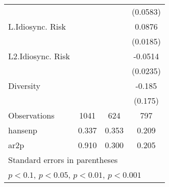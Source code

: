 {\begin{tabular}{l*{3}{c}}
                    &                     &                     &    (0.0583)         \\
L.Idiosync. Risk    &                     &                     &      0.0876\sym{***}\\
                    &                     &                     &    (0.0185)         \\
L2.Idiosync. Risk   &                     &                     &     -0.0514\sym{*}  \\
                    &                     &                     &    (0.0235)         \\
Diversity           &                     &                     &      -0.185         \\
                    &                     &                     &     (0.175)         \\
\hline
Observations        &        1041         &         624         &         797         \\
hansenp             &       0.337         &       0.353         &       0.209         \\
ar2p                &       0.910         &       0.300         &       0.205         \\
\hline\hline
\multicolumn{4}{l}{\footnotesize Standard errors in parentheses}\\
\multicolumn{4}{l}{\footnotesize \sym{+} \(p<0.1\), \sym{*} \(p<0.05\), \sym{**} \(p<0.01\), \sym{***} \(p<0.001\)}\\
\end{tabular}
}
